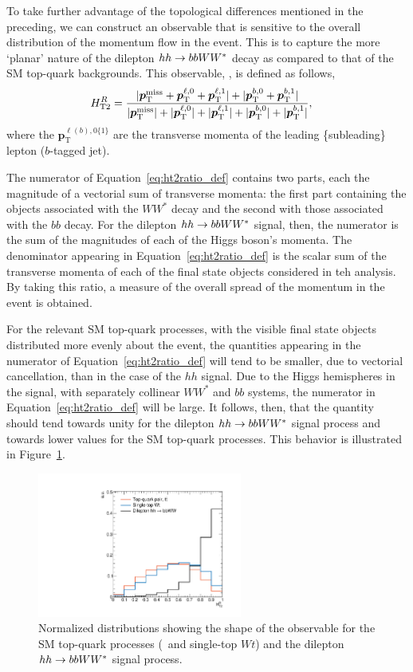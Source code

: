 To take further advantage of the topological differences mentioned in the preceding, we can construct
an observable that is sensitive to the overall distribution of the momentum flow in the event.
This is to capture the more `planar' nature of the dilepton $hh \rightarrow bbWW^*$ decay as compared
to that of the SM top-quark backgrounds.
This observable, \htratio, is defined as follows,
\begin{align}
    H_{\text{T2}}^{R} &= \frac{|\bm{p}_{\text{T}}^{\text{miss}} + \bm{p}_{\text{T}}^{\ell,0} + \bm{p}_{\text{T}}^{\ell,1}| + | \bm{p}_{\text{T}}^{b,0} + \bm{p}_{\text{T}}^{b,1}|}{|\bm{p}_{\text{T}}^{\text{miss}}| + |\bm{p}_{\text{T}}^{\ell,0}| + |\bm{p}_{\text{T}}^{\ell,1}| + |\bm{p}_{\text{T}}^{b,0}| + |\bm{p}_{\text{T}}^{b,1}|},
    \label{eq:ht2ratio_def}
\end{align}
where the $\bm{p}_{\text{T}}^{\ell(b),0 \{1\}}$ are the transverse momenta of the leading \{subleading\} lepton ($b$-tagged jet).

The numerator of Equation~\ref{eq:ht2ratio_def} contains two parts, each the magnitude of a vectorial sum of transverse
momenta: the first part containing the objects associated with the $WW^*$ decay and the second with those associated
with the $bb$ decay.
For the dilepton $hh \rightarrow bbWW^*$ signal, then, the numerator is the sum of the magnitudes of each of the Higgs boson's
momenta.
The denominator appearing in Equation~\ref{eq:ht2ratio_def} is the scalar sum of the transverse momenta of each of the
final state objects considered in teh analysis.
By taking this ratio, a measure of the overall spread of the momentum in the event is obtained.

For the relevant SM top-quark processes, with the visible final state objects distributed more evenly
about the event, the quantities appearing in the numerator of Equation~\ref{eq:ht2ratio_def} will
tend to be smaller, due to vectorial cancellation, than in the case of the $hh$ signal.
Due to the Higgs hemispheres in the signal, with separately collinear $WW^*$ and $bb$ systems,
the numerator in Equation~\ref{eq:ht2ratio_def} will be large.
It follows, then, that the quantity \htratio should tend towards unity for the dilepton $hh \rightarrow bbWW^*$
signal process and towards lower values for the SM top-quark processes.
This behavior is illustrated in Figure~\ref{fig:hh_shape_htratio}.

\begin{figure}[!htb]
    \begin{center}
        \includegraphics[width=0.6\textwidth]{figures/search_hh/signal_pheno/shape_plots/hh_shape_plot_HT2Ratio}
        \caption{
            Normalized distributions showing the shape of the \htratio observable for the SM
            top-quark processes (\ttbar~and single-top $Wt$) and the dilepton $hh \rightarrow bbWW^*$ signal process.
        }
        \label{fig:hh_shape_htratio}
    \end{center}
\end{figure}

